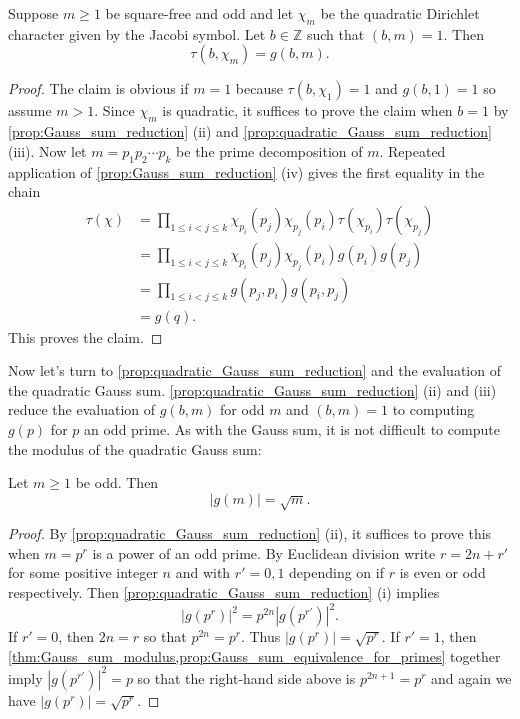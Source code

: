         \begin{theorem}
          Suppose $m \ge 1$ be square-free and odd and let $\chi_{m}$ be the quadratic Dirichlet character given by the Jacobi symbol. Let $b \in \mathbb{Z}$ such that $(b,m) = 1$. Then
          \[
            \tau(b,\chi_{m}) = g(b,m).
          \]
        \end{theorem}
        \begin{proof}
          The claim is obvious if $m = 1$ because $\tau(b,\chi_{1}) = 1$ and $g(b,1) = 1$ so assume $m > 1$. Since $\chi_{m}$ is quadratic, it suffices to prove the claim when $b = 1$ by \cref{prop:Gauss_sum_reduction} (ii) and \cref{prop:quadratic_Gauss_sum_reduction} (iii). Now let $m = p_{1}p_{2} \cdots p_{k}$ be the prime decomposition of $m$. Repeated application of \cref{prop:Gauss_sum_reduction} (iv) gives the first equality in the chain
          \begin{align*}
            \tau(\chi) &= \prod_{1 \le i < j \le k}\chi_{p_{i}}(p_{j})\chi_{p_{j}}(p_{i})\tau(\chi_{p_{i}})\tau(\chi_{p_{j}}) \\
            &= \prod_{1 \le i < j \le k}\chi_{p_{i}}(p_{j})\chi_{p_{j}}(p_{i})g(p_{i})g(p_{j}) \\
            &= \prod_{1 \le i < j \le k}g(p_{j},p_{i})g(p_{i},p_{j}) \\
            &= g(q).
          \end{align*}
          This proves the claim.
        \end{proof}

        Now let's turn to \cref{prop:quadratic_Gauss_sum_reduction} and the evaluation of the quadratic Gauss sum. \cref{prop:quadratic_Gauss_sum_reduction} (ii) and (iii) reduce the evaluation of $g(b,m)$ for odd $m$ and $(b,m) = 1$ to computing $g(p)$ for $p$ an odd prime. As with the Gauss sum, it is not difficult to compute the modulus of the quadratic Gauss sum:

        \begin{theorem}\label{thm:quadratic_Gauss_sum_modulus}
          Let $m \ge 1$ be odd. Then
          \[
            |g(m)| = \sqrt{m}.
          \]
        \end{theorem}
        \begin{proof}
          By \cref{prop:quadratic_Gauss_sum_reduction} (ii), it suffices to prove this when $m = p^{r}$ is a power of an odd prime. By Euclidean division write $r = 2n+r'$ for some positive integer $n$ and with $r' = 0,1$ depending on if $r$ is even or odd respectively. Then \cref{prop:quadratic_Gauss_sum_reduction} (i) implies
          \[
            |g(p^{r})|^{2} = p^{2n}|g(p^{r'})|^{2}.
          \]
          If $r' = 0$, then $2n = r$ so that $p^{2n} = p^{r}$. Thus $|g(p^{r})| = \sqrt{p^{r}}$. If $r' = 1$, then \cref{thm:Gauss_sum_modulus,prop:Gauss_sum_equivalence_for_primes} together imply $|g(p^{r'})|^{2} = p$ so that the right-hand side above is $p^{2n+1} = p^{r}$ and again we have $|g(p^{r})| = \sqrt{p^{r}}$.
        \end{proof}

